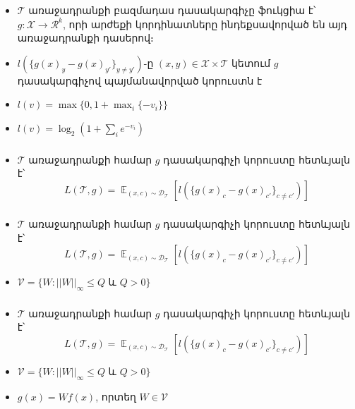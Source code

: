 \documentclass[10pt]{beamer}
\DeclareMathOperator*{\E}{\mathbb{E}}
\begin{document}
\begin{frame}[t]
\frametitle{}
\begin{itemize}
\vspace{5mm}
\item \armfont $\mathcal{T}$ առաջադրանքի բազմադաս դասակարգիչը ֆուկցիա է՝ $g:\mathcal{X} \rightarrow \mathcal{R}^{k}$, որի արժեքի կորդինատները ինդեքսավորված են այդ առաջադրանքի դասերով։

\item $l(\{ g(x)_y-g(x)_{y'}\}_{y \neq y'}  )$-ը $(x, y) \in \mathcal{X} \times \mathcal{T}$ կետում $g$ դասակարգիչով պայմանավորված կորուստն է
\item $l(v) = \max\{0, 1+\max_{i}\{-v_i\}\} $
\item $l(v) = \log_2(1+\sum_{i}{e^{-v_i}})$
\end{itemize}
\end{frame}


\begin{frame}[t]
\frametitle{}
\end{frame}


\begin{frame}[t]
\frametitle{}
\begin{itemize}
\vspace{5mm}
\item \armfont $\mathcal{T}$ առաջադրանքի համար $g$ դասակարգիչի կորուստը հետևյալն է՝
$$L(\mathcal{T}, g) = \E_{(x, c) \sim \mathcal{D}_{\mathcal{T}}} \left [ l(\{ g(x)_c-g(x)_{c'}\}_{c \neq c'}  ) \right ]$$

\end{itemize}
\end{frame}

\begin{frame}[t]
\frametitle{}
\begin{itemize}
\vspace{5mm}
\item \armfont $\mathcal{T}$ առաջադրանքի համար $g$ դասակարգիչի կորուստը հետևյալն է՝
$$L(\mathcal{T}, g) = \E_{(x, c) \sim \mathcal{D}_{\mathcal{T}}} \left [ l(\{ g(x)_c-g(x)_{c'}\}_{c \neq c'}  ) \right ]$$
\item $\mathcal{V} = \{W: ||W||_{\infty} \leq Q \text{ և } Q > 0\}$


\end{itemize}
\end{frame}

\begin{frame}[t]
\frametitle{}
\begin{itemize}
\vspace{5mm}
\item \armfont $\mathcal{T}$ առաջադրանքի համար $g$ դասակարգիչի կորուստը հետևյալն է՝
$$L(\mathcal{T}, g) = \E_{(x, c) \sim \mathcal{D}_{\mathcal{T}}} \left [ l(\{ g(x)_c-g(x)_{c'}\}_{c \neq c'}  ) \right ]$$
\item $\mathcal{V} = \{W: ||W||_{\infty} \leq Q \text{ և } Q > 0\}$
\item  $g(x) = Wf(x)$, որտեղ $W \in \mathcal{V}$

\end{itemize}
\end{frame}
\end{document}
